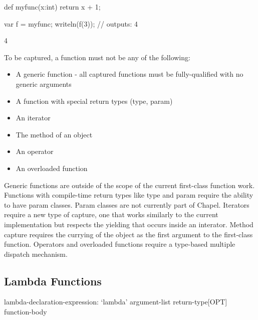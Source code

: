 \begin{example}
\begin{chapelpre}
\end{chapelpre}
\begin{chapel}
def myfunc(x:int) { return x + 1; }

var f = myfunc;
writeln(f(3)); // outputs: 4
\end{chapel}
\begin{chapeloutput}
4
\end{chapeloutput}
\end{example}

To be captured, a function must not be any of the following:

\begin{itemize}
\item
  A generic function - all captured functions must be fully-qualified with no generic arguments
\item
  A function with special return types (type, param)
\item
  An iterator
\item
  The method of an object
\item
  An operator
\item
  An overloaded function
\end{itemize}

\begin{rationale}
Generic functions are outside of the scope of the current first-class function work.  Functions with compile-time return types like type and param require the ability to have param classes.  Param classes are not currently part of Chapel.  Iterators require a new type of capture, one that works similarly to the current implementation but respects the yielding that occurs inside an interator.  Method capture requires the currying of the object as the first argument to the first-class function.  Operators and overloaded functions require a type-based multiple dispatch mechanism.
\end{rationale}

\subsection{Lambda Functions}
\label{Lambda_Functions}

\begin{syntax}
lambda-declaration-expression:
  `lambda' argument-list
    return-type[OPT] function-body
\end{syntax}


